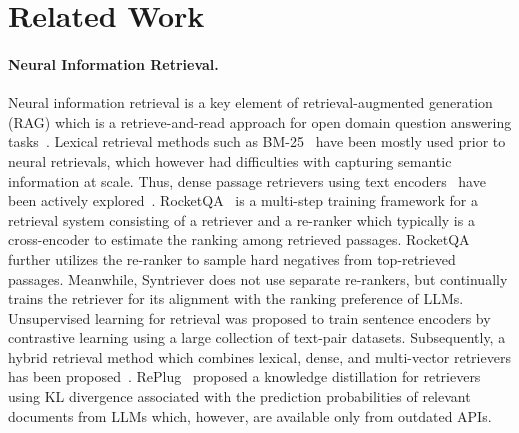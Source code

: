 \section{Related Work}

\paragraph{Neural Information Retrieval.}
Neural information retrieval is a key element of retrieval-augmented generation (RAG) \cite{lewis2020retrieval} which is a retrieve-and-read approach for open domain question answering tasks~\cite{chen2017reading}. 
Lexical retrieval methods such as BM-25~\cite{robertson2009probabilistic} have been mostly used prior to neural retrievals, which however had difficulties with capturing semantic information at scale. Thus, dense passage retrievers using text encoders~\cite{devlin2018bert} have been actively explored~\cite{karpukhin2020dense, gao2022unsupervised, xiong2021approximate}. 
RocketQA~\cite{qu2021rocketqa} is a multi-step training framework for a retrieval system consisting of a retriever and a re-ranker which typically is a cross-encoder to estimate the ranking among retrieved passages. RocketQA further utilizes the re-ranker to sample hard negatives from top-retrieved passages. Meanwhile, Syntriever does not use separate re-rankers, but continually trains the retriever for its alignment with the ranking preference of LLMs.
Unsupervised learning for retrieval \cite{izacard2021unsupervised, wang2022text} was proposed to train sentence encoders by contrastive learning using a large collection of text-pair datasets. Subsequently, a hybrid retrieval method which combines lexical, dense, and multi-vector retrievers has been proposed~\cite{chen2024bge}. RePlug~\cite{shi2024replug} proposed a knowledge distillation for retrievers using KL divergence associated with the prediction probabilities of relevant documents from LLMs which, however, are available only from outdated APIs. 

